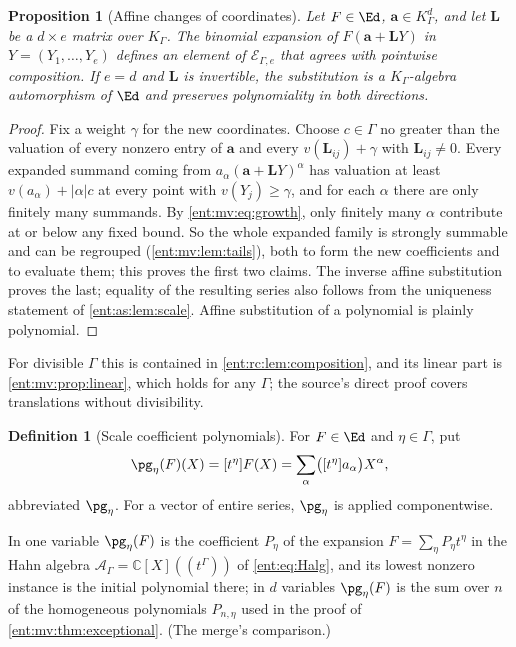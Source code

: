 \documentclass[11pt]{article}
\theoremstyle{plain}
\theoremstyle{plain}
\newtheorem{proposition}[proposition]{Proposition}
\theoremstyle{plain}
\theoremstyle{definition}
\newtheorem{definition}[definition]{Definition}
\theoremstyle{definition}
\theoremstyle{definition}
\theoremstyle{definition}
\theoremstyle{remark}
\newcommand{\C}{\mathbb C}\newcommand{\R}{\mathbb R}
\newcommand{\K}{K_\Gamma}\newcommand{\KD}{K_\Delta}
\newcommand{\A}{\mathcal A_\Gamma}\newcommand{\OO}{\mathcal O_\Gamma}
\begin{document}
\begin{proposition}[Affine changes of coordinates]\label{ent:as:prop:affine}
Let $F\in\Ed$, $\mathbf a\in\K^d$, and let $\mathbf L$ be a $d\times e$ matrix
over $\K$. The binomial expansion of $F(\mathbf a+\mathbf LY)$ in
$Y=(Y_1,\ldots,Y_e)$ defines an element of $\mathcal E_{\Gamma,e}$ that agrees
with pointwise composition. If $e=d$ and $\mathbf L$ is invertible, the
substitution is a $\K$-algebra automorphism of $\Ed$ and preserves
polynomiality in both directions.
\end{proposition}
\begin{proof}
Fix a weight $\gamma$ for the new coordinates. Choose $c\in\Gamma$ no greater
than the valuation of every nonzero entry of $\mathbf a$ and every
$v(\mathbf L_{ij})+\gamma$ with $\mathbf L_{ij}\ne0$. Every expanded summand
coming from $a_\alpha(\mathbf a+\mathbf LY)^\alpha$ has valuation at least
$v(a_\alpha)+|\alpha|c$ at every point with $v(Y_j)\ge\gamma$, and for each
$\alpha$ there are only finitely many summands. By \eqref{ent:mv:eq:growth},
only finitely many $\alpha$ contribute at or below any fixed bound. So the whole
expanded family is strongly summable and can be regrouped
(\cref{ent:mv:lem:tails}), both to form the new coefficients and to evaluate
them; this proves the first two claims. The inverse affine substitution
proves the last; equality of the resulting series also follows from the
uniqueness statement of \cref{ent:as:lem:scale}. Affine substitution of a
polynomial is plainly polynomial.
\end{proof}

For divisible $\Gamma$ this is contained in \cref{ent:rc:lem:composition}, and
its linear part is \cref{ent:mv:prop:linear}, which holds for any $\Gamma$; the
source's direct proof covers translations without divisibility.

\begin{definition}[Scale coefficient polynomials]\label{ent:as:def:scale}
For $F\in\Ed$ and $\eta\in\Gamma$, put
\begin{equation}\label{ent:as:eq:p-eta}
 \pg_\eta(F)(X)=[t^\eta]F(X)
 =\sum_{\alpha}\bigl([t^\eta]a_\alpha\bigr)X^\alpha ,
\end{equation}
abbreviated $\pg_\eta$. For a vector of entire series, $\pg_\eta$ is applied
componentwise.
\end{definition}

In one variable $\pg_\eta(F)$ is the coefficient $P_\eta$ of the expansion
$F=\sum_\eta P_\eta t^\eta$ in the Hahn algebra $\A=\C[X]((t^\Gamma))$ of
\eqref{ent:eq:Halg}, and its lowest nonzero instance is the initial polynomial
there; in $d$ variables $\pg_\eta(F)$ is the sum over $n$ of the homogeneous
polynomials $P_{n,\eta}$ used in the proof of \cref{ent:mv:thm:exceptional}.
(The merge's comparison.)
\end{document}
